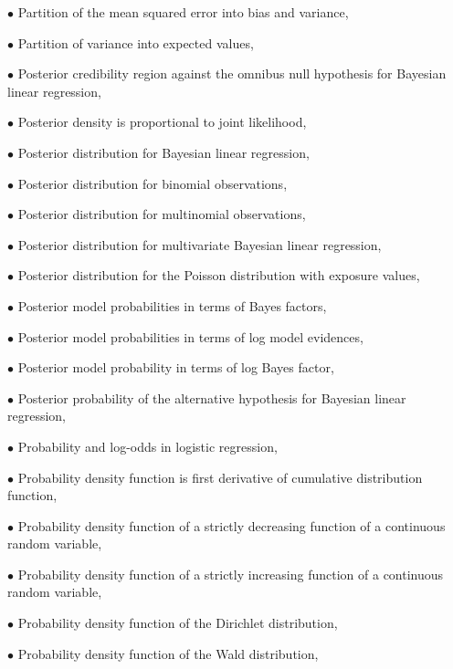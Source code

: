 \documentclass[a4paper,12pt,twoside]{book}
\begin{document}
$\bullet$ Partition of the mean squared error into bias and variance, \pageref{sec:mse-bnv}

$\bullet$ Partition of variance into expected values, \pageref{sec:var-mean}

$\bullet$ Posterior credibility region against the omnibus null hypothesis for Bayesian linear regression, \pageref{sec:blr-pcr}

$\bullet$ Posterior density is proportional to joint likelihood, \pageref{sec:post-jl}

$\bullet$ Posterior distribution for Bayesian linear regression, \pageref{sec:blr-post}

$\bullet$ Posterior distribution for binomial observations, \pageref{sec:bin-post}

$\bullet$ Posterior distribution for multinomial observations, \pageref{sec:mult-post}

$\bullet$ Posterior distribution for multivariate Bayesian linear regression, \pageref{sec:mblr-post}

$\bullet$ Posterior distribution for the Poisson distribution with exposure values, \pageref{sec:poissexp-post}

$\bullet$ Posterior model probabilities in terms of Bayes factors, \pageref{sec:pmp-bf}

$\bullet$ Posterior model probabilities in terms of log model evidences, \pageref{sec:pmp-lme}

$\bullet$ Posterior model probability in terms of log Bayes factor, \pageref{sec:pmp-lbf}

$\bullet$ Posterior probability of the alternative hypothesis for Bayesian linear regression, \pageref{sec:blr-pp}

$\bullet$ Probability and log-odds in logistic regression, \pageref{sec:logreg-pnlo}

$\bullet$ Probability density function is first derivative of cumulative distribution function, \pageref{sec:pdf-cdf}

$\bullet$ Probability density function of a strictly decreasing function of a continuous random variable, \pageref{sec:pdf-sdfct}

$\bullet$ Probability density function of a strictly increasing function of a continuous random variable, \pageref{sec:pdf-sifct}

$\bullet$ Probability density function of the Dirichlet distribution, \pageref{sec:dir-pdf}

$\bullet$ Probability density function of the Wald distribution, \pageref{sec:wald-pdf}
\end{document}
